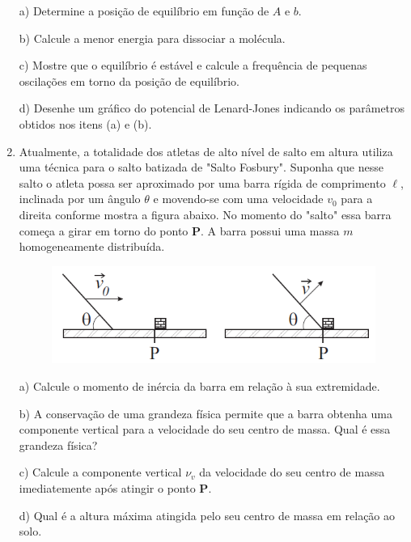 \begin{enumerate}[start=1,label={\bfseries Q\arabic*.}]
a) Determine a posição de equilíbrio em função de $A$ e $b$.

\resposta

b) Calcule a menor energia para dissociar a molécula.

\resposta

c) Mostre que o equilíbrio é estável e calcule a frequência de pequenas oscilações em torno da posição de equilíbrio.

\resposta

d) Desenhe um gráfico do potencial de Lenard-Jones indicando os parâmetros obtidos nos itens (a) e (b).

\resposta


\item Atualmente, a totalidade dos atletas de alto nível de salto em altura utiliza uma técnica para o salto batizada de "Salto Fosbury". Suponha que nesse salto o atleta possa ser aproximado por uma barra rígida de comprimento $\ell$, inclinada por um ângulo $\theta$ e movendo-se com uma velocidade $v_{0}$ para a direita conforme mostra a figura abaixo. No momento do "salto" essa barra começa a girar em torno do ponto \textbf{P}. A barra possui uma massa $m$ homogeneamente distribuída.
\begin{figure}[H]
\centering
\includegraphics[scale=0.7]{classica-img/massa.png}
\end{figure}

a) Calcule o momento de inércia da barra em relação à sua extremidade.

\resposta

b) A conservação de uma grandeza física permite que a barra obtenha uma componente vertical para a velocidade do seu centro de massa. Qual é essa grandeza física?

\resposta

c) Calcule a componente vertical $\nu_{v}$ da velocidade do seu centro de massa imediatemente após atingir o ponto \textbf{P}.

\resposta

d) Qual é a altura máxima atingida pelo seu centro de massa em relação ao solo.


\end{enumerate}
